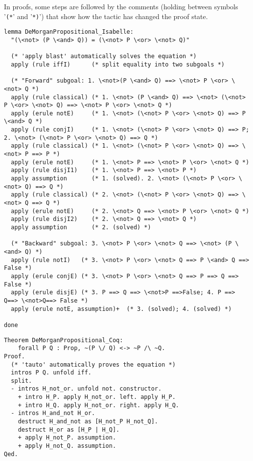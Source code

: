 \documentclass[article]{aaltoseries}
\begin{document}
In proofs, some steps are followed by the comments (holding between symbols '\texttt{(*}' and '\texttt{*)}') that show how the tactic has changed the proof state.
\begin{lstlisting}[language=isabelle, caption={Proof of the de Morgan's law for propositions in Isabelle}, label={ex_morgan_propos_isabelle}]
lemma DeMorganPropositional_Isabelle:
  "(\<not> (P \<and> Q)) = (\<not> P \<or> \<not> Q)"
  
  (* 'apply blast' automatically solves the equation *)
  apply (rule iffI)      (* split equality into two subgoals *)
  
  (* "Forward" subgoal: 1. \<not>(P \<and> Q) ==> \<not> P \<or> \<not> Q *)
  apply (rule classical) (* 1. \<not> (P \<and> Q) ==> \<not> (\<not> P \<or> \<not> Q) ==> \<not> P \<or> \<not> Q *)
  apply (erule notE)     (* 1. \<not> (\<not> P \<or> \<not> Q) ==> P \<and> Q *)
  apply (rule conjI)     (* 1. \<not> (\<not> P \<or> \<not> Q) ==> P; 2. \<not> (\<not> P \<or> \<not> Q) ==> Q *)
  apply (rule classical) (* 1. \<not> (\<not> P \<or> \<not> Q) ==> \<not> P ==> P *)
  apply (erule notE)     (* 1. \<not> P ==> \<not> P \<or> \<not> Q *)
  apply (rule disjI1)    (* 1. \<not> P ==> \<not> P *)
  apply assumption       (* 1. (solved). 2. \<not> (\<not> P \<or> \<not> Q) ==> Q *)
  apply (rule classical) (* 2. \<not> (\<not> P \<or> \<not> Q) ==> \<not> Q ==> Q *)
  apply (erule notE)     (* 2. \<not> Q ==> \<not> P \<or> \<not> Q *)
  apply (rule disjI2)    (* 2. \<not> Q ==> \<not> Q *)
  apply assumption       (* 2. (solved) *)
  
  (* "Backward" subgoal: 3. \<not> P \<or> \<not> Q ==> \<not> (P \<and> Q) *)
  apply (rule notI)   (* 3. \<not> P \<or> \<not> Q ==> P \<and> Q ==> False *)   
  apply (erule conjE) (* 3. \<not> P \<or> \<not> Q ==> P ==> Q ==> False *)
  apply (erule disjE) (* 3. P ==> Q ==> \<not>P ==>False; 4. P ==> Q==> \<not>Q==> False *)
  apply (erule notE, assumption)+  (* 3. (solved); 4. (solved) *)
  
done
\end{lstlisting}


    
\begin{lstlisting}[language=coq, caption={Proof of the de Morgan's law for propositions in Coq}, label={ex_morgan_propos_coq}]
Theorem DeMorganPropositional_Coq:
    forall P Q : Prop, ~(P \/ Q) <-> ~P /\ ~Q.  
Proof.
  (* 'tauto' automatically proves the equation *)
  intros P Q. unfold iff.
  split.
  - intros H_not_or. unfold not. constructor.
    + intro H_P. apply H_not_or. left. apply H_P.
    + intro H_Q. apply H_not_or. right. apply H_Q.
  - intros H_and_not H_or.
    destruct H_and_not as [H_not_P H_not_Q].
    destruct H_or as [H_P | H_Q].
    + apply H_not_P. assumption.
    + apply H_not_Q. assumption.
Qed.
\end{lstlisting}
\end{document}
